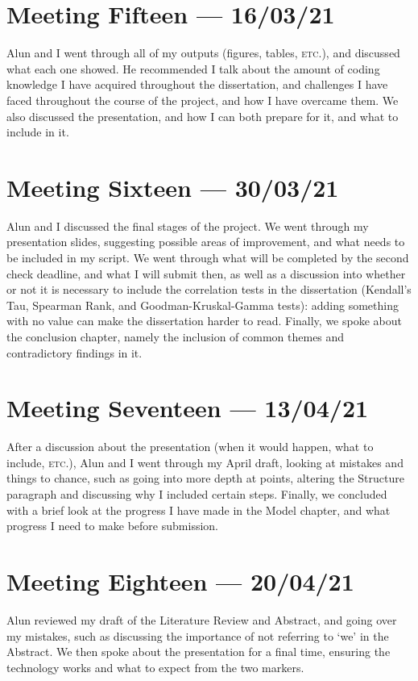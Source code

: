 \documentclass[a4paper,10pt]{report}
\begin{document}
\section*{Meeting Fifteen --- 16/03/21}
Alun and I went through all of my outputs (figures, tables, \textsc{etc}.), and discussed what each one showed. He recommended I talk about the amount of coding knowledge I have acquired throughout the dissertation, and challenges I have faced throughout the course of the project, and how I have overcame them. We also discussed the presentation, and how I can both prepare for it, and what to include in it. 

\section*{Meeting Sixteen --- 30/03/21}
Alun and I discussed the final stages of the project. We went through my presentation slides, suggesting possible areas of improvement, and what needs to be included in my script. We went through what will be completed by the second check deadline, and what I will submit then, as well as a discussion into whether or not it is necessary to include the correlation tests in the dissertation (Kendall's Tau, Spearman Rank, and Goodman-Kruskal-Gamma tests): adding something with no value can make the dissertation harder to read. Finally, we spoke about the conclusion chapter, namely the inclusion of common themes and contradictory findings in it. 

\section*{Meeting Seventeen --- 13/04/21}
After a discussion about the presentation (when it would happen, what to include, \textsc{etc}.), Alun and I went through my April draft, looking at mistakes and things to chance, such as going into more depth at points, altering the Structure paragraph and discussing why I included certain steps. Finally, we concluded with a brief look at the progress I have made in the Model chapter, and what progress I need to make before submission. 

\section*{Meeting Eighteen --- 20/04/21}
Alun reviewed my draft of the Literature Review and Abstract, and going over my mistakes, such as discussing the importance of not referring to `we' in the Abstract. We then spoke about the presentation for a final time, ensuring the technology works and what to expect from the two markers. 
\end{document}
